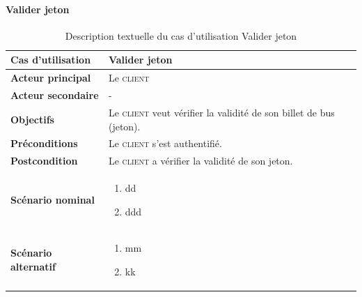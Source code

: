         \paragraph[Scanner jeton]{Valider jeton}
        \begin{longtable}{p{4cm} p{9cm}}
            \caption{Description textuelle du cas d’utilisation Valider jeton}
            \label{table:usecaseScannerJ}
            \\\hline\hline
                \textbf{Cas d’utilisation} & \textbf{Valider jeton}
            \\\hline\hline
                    \textbf{Acteur principal} & Le \textsc{client}
                \\
                    \textbf{Acteur secondaire} & -
                \\
                    \textbf{Objectifs} & Le \textsc{client} veut vérifier la
                    validité de son billet de bus (jeton).
                \\
                    \textbf{Préconditions} & Le \textsc{client} s’est authentifié.
                \\
                    \textbf{Postcondition} & Le \textsc{client} a vérifier la validité de son jeton.
                \\
                \textbf{Scénario nominal} &
                    \begin{enumerate}[leftmargin=*]
                        \item dd
                        \item ddd
                    \end{enumerate}
                \\
                \textbf{Scénario alternatif} &
                    \begin{enumerate}[leftmargin=*]
                        \item mm
                        \item kk
                    \end{enumerate}
            \\\bottomrule
        \end{longtable}

